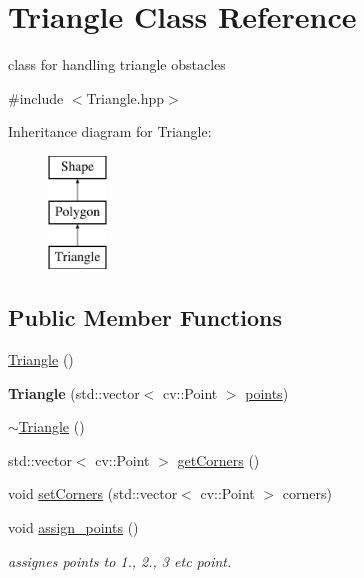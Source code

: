 \hypertarget{class_triangle}{}\section{Triangle Class Reference}
\label{class_triangle}


class for handling triangle obstacles  




{\ttfamily \#include $<$Triangle.\+hpp$>$}

Inheritance diagram for Triangle\+:\begin{figure}[H]
\begin{center}
\leavevmode
\includegraphics[height=3.000000cm]{class_triangle}
\end{center}
\end{figure}
\subsection*{Public Member Functions}
\begin{DoxyCompactItemize}
\item 
\mbox{\hyperlink{class_triangle_aaefe4ed500c07918d30c6f0e286332c5}{Triangle}} ()
\item 
\mbox{\label{class_triangle_ae4abb1f7e3d08675c64ed7c05b00e2a9}} 
{\bfseries Triangle} (std\+::vector$<$ cv\+::\+Point $>$ \mbox{\hyperlink{class_polygon_a347474823f6113a34fdefeee276d1b9e}{points}})
\item 
\mbox{\hyperlink{class_triangle_a5199760a17454f4dc94c855a57e3a152}{$\sim$\+Triangle}} ()
\item 
std\+::vector$<$ cv\+::\+Point $>$ \mbox{\hyperlink{class_triangle_a0c77555fd0e47f1344c23fa880f43777}{get\+Corners}} ()
\item 
void \mbox{\hyperlink{class_triangle_ad2d4cecee7e87e10d8b2787199d784c2}{set\+Corners}} (std\+::vector$<$ cv\+::\+Point $>$ corners)
\item 
\mbox{\label{class_triangle_a8ed27f340b83f8c235bb914e1ad5778e}} 
void \mbox{\hyperlink{class_triangle_a8ed27f340b83f8c235bb914e1ad5778e}{assign\+\_\+points}} ()
\begin{DoxyCompactList}\small\item\em assignes points to 1., 2., 3 etc point. \end{DoxyCompactList}\end{DoxyCompactItemize}
